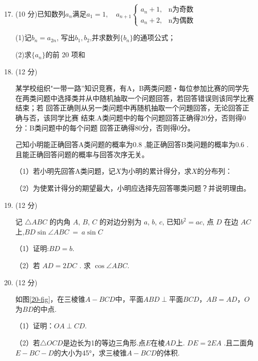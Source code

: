 \documentclass[twocolumn,landscape]{article}
\begin{document}
		\begin{enumerate}\setcounter{enumi}{16}
		\item (10 分)已知数列{$a_n$}满足$a_1=1,\quad a_{n+1}\begin{cases}a_n+1,&\mbox{n为奇数}\\a_n+2,&\mbox{n为偶数}\end{cases}$
  
  (1)记$b_n=a_{2n}$, 写出$b_1,b_2$,并求数列$\{b_n\}$的通项公式；
  
  (2)求$\{a_n\}$的前 20 项和
  
\vspace{1.5cm}
		

\item  (12 分)

某学校组织"一带一路”知识竞赛，有A，B两类问题・每位参加比赛的同学先在两类问题中选择类并从中随机抽取一个问题回答，若回答错误则该同学比赛结束；若 回答正确则从另一类问题中再随机抽取一个问題回答，无论回答正确与否，该同学比赛 结束.A类问题中的每个问题回答正确得20分，否则得0分：B类问题中的每个问题 回答正确得80分，否则得0分。

己知小明能正确回答A类问题的概率为0.8 ,能正确回答B类问題的概率为0.6 . 且能正确回答问题的概率与回答次序无关。

（1）若小明先回答A类问题，记$X$为小明的累计得分，求$X$的分布列：

（2）为使累计得分的期望最大，小明应选择先回答哪类问题？并说明理由。

\vspace{1.5cm}

\item  (12 分)

记 $\bigtriangleup ABC$ 的内角 $A$, $B$, $C$ 的对边分别为 $a$, $b$, $c$, 已知$b^2 = ac$, 点 $D$ 在边 $AC$ 上,$BD \sin{\angle ABC}~=~a\sin{C}$

（1）证明:$BD = b$.

（2）若 $AD = 2DC$ . 求 $\cos{\angle ABC}$.

\vspace{1.5cm}
\newpage

\item  (12 分)

如图\ref{20-fig}，在三棱锥$A-BCD$中，$\text{平面}ABD\perp \text{平面}BCD$，$AB=AD$，$O$为$BD$的中点.

（1）证明：$OA \perp CD$.

（2）若$\bigtriangleup OCD$是边长为1的等边三角形.点$E$在棱$AD$上. $DE = 2EA$ .且二面角$E-BC-D$的大小为45°，求三棱锥$A-BCD$的体积.


\end{enumerate}
\end{document}
